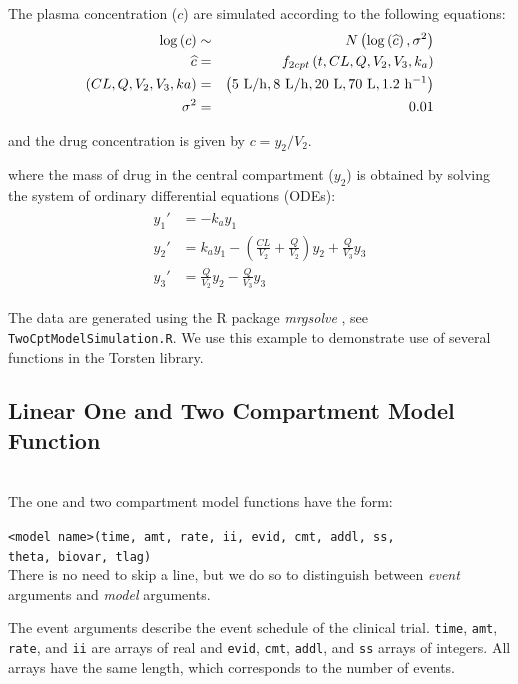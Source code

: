 \documentclass[11pt]{amsart}
\begin{document}
The plasma concentration ($c$) are simulated according to the following equations:
\begin{eqnarray*}
\log\left(c\right) &\sim& N\left(\log\left(\widehat{c}\right),\sigma^2\right) \\
 \widehat{c} &=& f_{2cpt}\left(t, CL, Q, V_2, V_3, k_a\right) \\
  \left(CL, Q, V_2, V_3, ka\right) &=& 
	\left(5\ {\rm L/h}, 8\  {\rm L/h}, 20\  {\rm L},  70\ {\rm L}, 1.2\ {\rm h^{-1}} \right) \\
  \sigma^2 &=& 0.01
\end{eqnarray*}

and the drug concentration is given by $c = y_2/V_2$.

where the mass of drug in the central compartment ($y_2$) is obtained by solving the system of ordinary differential equations (ODEs):
\begin{eqnarray}
  \begin{aligned}
  y_1' &= -k_a y_1 \\
  y_2' &= k_a y_1 - \left(\frac{CL}{V_2} + \frac{Q}{V_2}\right) y_2 +  \frac{Q}{V_3}  y_3  \\ 
  y_3' &= \frac{Q}{V_2} y_2 - \frac{Q}{V_3} y_3
  \end{aligned}
  \label{eq:TwoCpt}
\end{eqnarray}

The data are generated using the R package \textit{mrgsolve} \cite{mrgsolve2017}, see \texttt{TwoCptModelSimulation.R}. We use this example to demonstrate use of several functions in the Torsten library.

\subsection{Linear One and Two Compartment Model Function} \ \\

The one and two compartment model functions have the form:

\texttt{<model name>(time, amt, rate, ii, evid, cmt, addl, ss,\\
\phantom{<model name>} theta,  biovar, tlag)} \\

There is no need to skip a line, but we do so to distinguish between \textit{event} arguments and \textit{model} arguments.

The event arguments describe the event schedule of the clinical trial. \texttt{time}, \texttt{amt}, \texttt{rate},  and \texttt{ii} are arrays of real and \texttt{evid}, \texttt{cmt}, \texttt{addl}, and \texttt{ss} arrays of integers. All arrays have the same length, which corresponds to the number of events.
\end{document}
